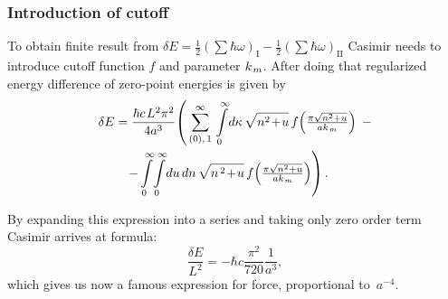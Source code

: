 \documentclass[10pt,t]{beamer}
\begin{document}
\begin{frame}
  \frametitle{Introduction of cutoff}


  To obtain finite result from
  $\delta E = \frac{ 1 }{ 2 } ( \sum \hbar \omega )_{ \text{I} } -
  \frac{ 1 }{ 2 } ( \sum \hbar \omega )_{ \text{II} }$ Casimir needs to introduce
  cutoff function $f$ and parameter $k_{ \hspace{0.09em} m }$.
  After doing that regularized energy difference of zero-point energies is
  given by
  \begin{equation}
    \label{eq:Short-history-ETC-03}
    \begin{split}
      \delta E
      &=
        \frac{ \hbar c \HorSpaceFive L^{ 2 } \pi^{ 2 } }{ 4 a^{ 3 } } \!
        \left( \, \sum_{ ( 0 ), \, 1 }^{ \infty } \,
        \int\limits_{ 0 }^{ \infty } \! d\kappa \, \sqrt{ n^{ 2 } \! + \! u } \,
        f\!\left( \tfrac{ \pi \sqrt{ n^{ 2 } + u } }{ a k_{ \HorSpaceTwo m } }
        \right) \right. \, - \\
      &\left. \;\;\;
        - \int\limits_{ 0 }^{ \infty } \! \int\limits_{ 0 }^{ \infty } \! du \, dn \,
        \sqrt{ n^{ \, 2 } \! + \! u } \,
        f\!\left( \tfrac{ \pi \sqrt{ n^{ 2 } + u } }{
        a k_{ \HorSpaceTwo m } } \right) \right).
    \end{split}
  \end{equation}

  By expanding this expression into a series and taking only zero order term
  Casimir arrives at formula:
  \begin{equation}
    \label{eq:Short-history-ETC-04}
    \frac{ \delta E }{ L^{ 2 } } =
    -\hbar c \frac{ \pi^{ 2 } }{ 720 } \frac{ 1 }{ a^{ 3 } },
  \end{equation}
  which gives us now a famous expression for force, proportional
  to~$a^{ -4 }$.

\end{frame}
\end{document}
